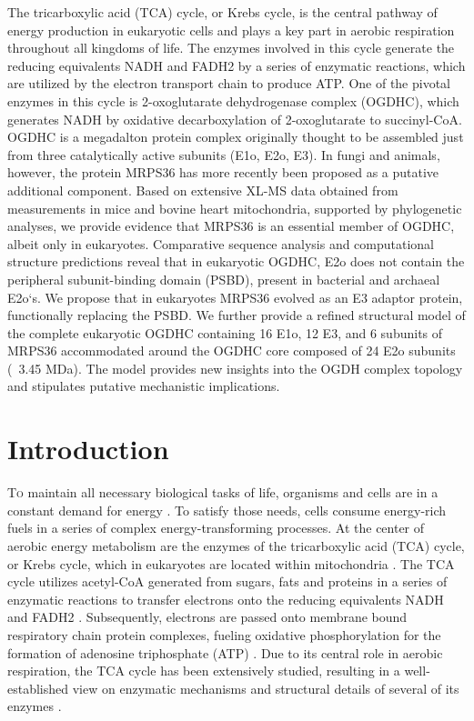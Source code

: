 \begin{abstract102}
    The tricarboxylic acid (TCA) cycle, or Krebs cycle, is the central pathway of energy production in eukaryotic cells and plays a key part in aerobic respiration throughout all kingdoms of life. The enzymes involved in this cycle generate the reducing equivalents NADH and FADH2 by a series of enzymatic reactions, which are utilized by the electron transport chain to produce ATP. One of the pivotal enzymes in this cycle is 2-oxoglutarate dehydrogenase complex (OGDHC), which generates NADH by oxidative decarboxylation of 2-oxoglutarate to succinyl-CoA. OGDHC is a megadalton protein complex originally thought to be assembled just from three catalytically active subunits (E1o, E2o, E3). In fungi and animals, however, the protein MRPS36 has more recently been proposed as a putative additional component. Based on extensive XL-MS data obtained from measurements in mice and bovine heart mitochondria, supported by phylogenetic analyses, we provide evidence that MRPS36 is an essential member of OGDHC, albeit only in eukaryotes. Comparative sequence analysis and computational structure predictions reveal that in eukaryotic OGDHC, E2o does not contain the peripheral subunit-binding domain (PSBD), present in bacterial and archaeal E2o`s. We propose that in eukaryotes MRPS36 evolved as an E3 adaptor protein, functionally replacing the PSBD. We further provide a refined structural model of the complete eukaryotic OGDHC containing 16 E1o, 12 E3, and 6 subunits of MRPS36 accommodated around the OGDHC core composed of 24 E2o subunits (~3.45 MDa). The model provides new insights into the OGDH complex topology and stipulates putative mechanistic implications.
\end{abstract102}
%
\thumbforchapter
\section{Introduction}
\lettrine[lraise=0.1, nindent=0em, slope=-.5em]{T}{o} maintain all necessary biological tasks of life, organisms and cells are in a constant demand for energy \cite{Rigoulet_2020}. To satisfy those needs, cells consume energy-rich fuels in a series of complex energy-transforming processes. At the center of aerobic energy metabolism are the enzymes of the tricarboxylic acid (TCA) cycle, or Krebs cycle, which in eukaryotes are located within mitochondria \cite{Cavalcanti_2014,Martinez-Reyes_2020,Siriwat_2018}. The TCA cycle utilizes acetyl-CoA generated from sugars, fats and proteins in a series of enzymatic reactions to transfer electrons onto the reducing equivalents NADH and FADH2 \cite{Walsh_2018}. Subsequently, electrons are passed onto membrane bound respiratory chain protein complexes, fueling oxidative phosphorylation for the formation of adenosine triphosphate (ATP) \cite{Kaila_2021,Martinez-Reyes_2016}. Due to its central role in aerobic respiration, the TCA cycle has been extensively studied, resulting in a well-established view on enzymatic mechanisms and structural details of several of its enzymes \cite{Gleason_1994,Joyce_2000,Lauble_1992,Remington_1982,Spinelli_2018,Taylor_2008,Weaver_1996,Yankovskaya_2003}.

